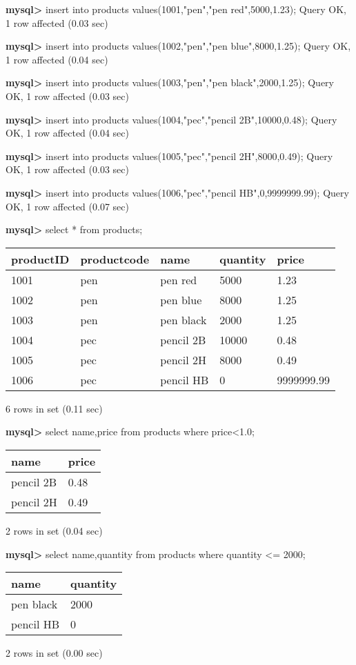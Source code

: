 \documentclass[11pt]{article}
\begin{document}
\textbf{mysql>} insert into products values(1001,"pen","pen red",5000,1.23);
Query OK, 1 row affected (0.03 sec)

\textbf{mysql>} insert into products values(1002,"pen","pen blue",8000,1.25);
Query OK, 1 row affected (0.04 sec)

\textbf{mysql>} insert into products values(1003,"pen","pen black",2000,1.25);
Query OK, 1 row affected (0.03 sec)

\textbf{mysql>} insert into products values(1004,"pec","pencil 2B",10000,0.48);
Query OK, 1 row affected (0.04 sec)

\textbf{mysql>} insert into products values(1005,"pec","pencil 2H",8000,0.49);
Query OK, 1 row affected (0.03 sec)

\textbf{mysql>} insert into products values(1006,"pec","pencil HB",0,9999999.99);
Query OK, 1 row affected (0.07 sec)

\textbf{mysql>} select * from products;
\begin{center}
\begin{tabular}{|l|l|l|l|l|}
\hline
productID & productcode & name & quantity & price \\
\hline
1001 & pen & pen red & 5000 & 1.23 \\
1002 & pen & pen blue & 8000 & 1.25 \\
1003 & pen & pen black & 2000 & 1.25 \\
1004 & pec & pencil 2B & 10000 & 0.48 \\
1005 & pec & pencil 2H & 8000 & 0.49 \\
1006 & pec & pencil HB & 0 & 9999999.99 \\
\hline
\end{tabular}
\end{center}
6 rows in set (0.11 sec)

\textbf{mysql>} select name,price from products where price<1.0;
\begin{center}
\begin{tabular}{|l|l|}
\hline
name & price \\
\hline
pencil 2B & 0.48 \\
pencil 2H & 0.49 \\
\hline
\end{tabular}
\end{center}
2 rows in set (0.04 sec)

\textbf{mysql>} select name,quantity from products where quantity <= 2000;
\begin{center}
\begin{tabular}{|l|l|}
\hline
name & quantity \\
\hline
pen black & 2000 \\
pencil HB & 0 \\
\hline
\end{tabular}
\end{center}
2 rows in set (0.00 sec)
\end{document}
